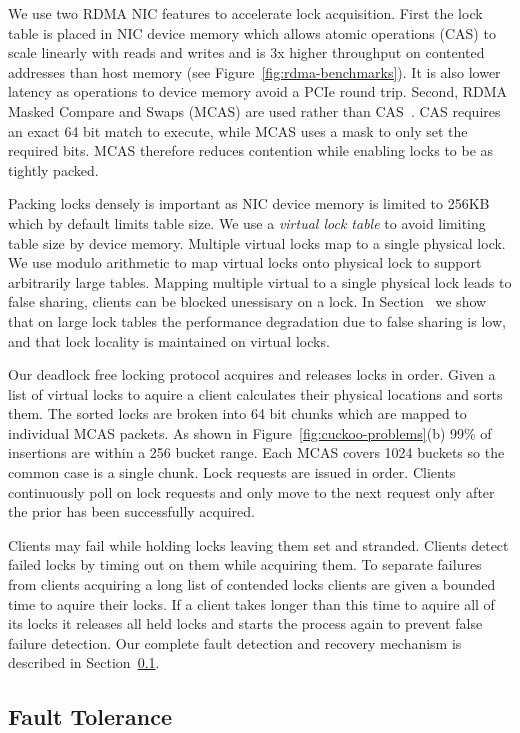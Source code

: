 We use two RDMA NIC features to accelerate lock
acquisition. First the lock table is placed in NIC device
memory which allows atomic operations (CAS) to
scale linearly with reads and writes and is 3x higher
throughput on contented addresses than host memory (see
Figure~\ref{fig:rdma-benchmarks}). It is also lower latency
as operations to device memory avoid a PCIe round trip.
Second, RDMA Masked Compare and Swaps (MCAS) are used rather
than CAS~\cite{rdma-masked-cas,sherman}. CAS requires an
exact 64 bit match to execute, while MCAS uses a mask to
only set the required bits. MCAS therefore reduces
contention while enabling locks to be as tightly packed.

Packing locks densely is important as NIC device memory is
limited to 256KB which by default limits table size. We use
a \textit{virtual lock table} to avoid limiting table size
by device memory.  Multiple virtual locks map to a single
physical lock. We use modulo arithmetic to map virtual locks
onto physical lock to support arbitrarily large tables.
Mapping multiple virtual to a single physical lock leads to
false sharing, clients can be blocked unessisary on a lock.
In Section~ we show that on large lock tables the
performance degradation due to false sharing is low, and
that lock locality is maintained on virtual locks.

Our deadlock free locking protocol acquires and releases
locks in order.  Given a list of virtual locks to aquire a
client calculates their physical locations and sorts them.
The sorted locks are broken into 64 bit chunks which are
mapped to individual MCAS packets. As shown in
Figure~\ref{fig:cuckoo-problems}(b) 99\% of insertions are
within a 256 bucket range. Each MCAS covers 1024 buckets so
the common case is a single chunk. Lock requests are issued
in order. Clients continuously poll on lock requests and
only move to the next request only after the prior has been
successfully acquired.

Clients may fail while holding locks leaving them set and
stranded. Clients detect failed locks by timing out on them
while acquiring them. To separate failures from clients
acquiring a long list of contended locks clients are given a
bounded time to aquire their locks. If a client takes longer
than this time to aquire all of its locks it releases all
held locks and starts the process again to prevent false
failure detection. Our complete fault detection and recovery
mechanism is described in Section~\ref{sec:fault-tolerance}.

\subsection{Fault Tolerance}
\label{sec:fault-tolerance}

